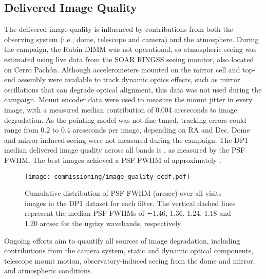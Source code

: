 \subsection{Delivered Image Quality
\label{ssec:image_quality}}
The delivered image quality is influenced by contributions from both the observing system (i.e., dome, telescope and \gls{camera}) and the atmosphere.
During the campaign, the Rubin \gls{DIMM} was not operational, so atmospheric seeing was estimated using live data from the \gls{SOAR} \gls{RINGSS} seeing monitor, also located on Cerro Pach\'on.
Although accelerometers mounted on the mirror cell and top-end assembly were available to track dynamic optics effects, such as mirror oscillations that can degrade optical alignment, this data was not used during the campaign.
Mount encoder data were used to measure the mount jitter in every image, with a measured median contribution of 0.004 arcseconds to image degradation.
As the pointing model was not fine tuned, tracking errors could range from 0.2 to 0.4 arcseconds per image, depending on RA and Dec.
Dome and mirror-induced \gls{seeing} were not measured during the campaign.
% 
The DP1 median delivered image quality across all bands is \medianimagequalityallbands, as measured by the \gls{PSF} \gls{FWHM}.
The best images achieved a \gls{PSF} \gls{FWHM} of approximately \bestimagequality.
\begin{figure}[htb]
\centering
\texttt{[image: commissioning/image\_quality\_ecdf.pdf]}
\caption{Cumulative distribution of \gls{PSF} \gls{FWHM} (arcsec) over all \nvisitdetectorsummaries visits images in the DP1 dataset for each filter. 
The vertical dashed lines represent the median PSF FWHMs of ∼1.46, 1.36, 1.24, 1.18 and 1.20 arcsec for the ugrizy wavebands, respectively
}
\label{fig:delivered_image_quality_ecdf}
\end{figure}
Ongoing efforts aim to quantify all sources of image degradation,  including contributions from the \gls{camera} system, static and dynamic optical components, telescope mount motion,  observatory-induced seeing from the dome and mirror, and atmospheric conditions.
